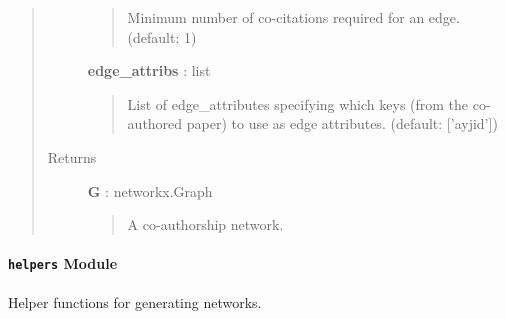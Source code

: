 \documentclass[letterpaper,10pt,english]{sphinxmanual}
\begin{document}
\begin{fulllineitems}
\begin{quote}
\begin{description}
\begin{quote}
Minimum number of co-citations required for an edge. (default: 1)
\end{quote}

\textbf{edge\_attribs} : list
\begin{quote}

List of edge\_attributes specifying which {\hyperref[tethne:tethne.data.Paper]{}} keys (from the
co-authored paper) to use as edge attributes. (default: {[}'ayjid'{]})
\end{quote}

\item[{Returns }] \leavevmode
\textbf{G} : networkx.Graph
\begin{quote}

A co-authorship network.
\end{quote}

\end{description}\end{quote}

\end{fulllineitems}



\paragraph{\texttt{helpers} Module}
\label{tethne.networks:helpers-module}\label{tethne.networks:module-tethne.networks.helpers}
Helper functions for generating networks.
\end{document}
